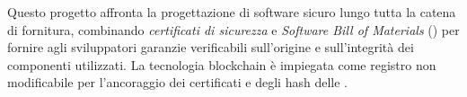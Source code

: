 Questo progetto affronta la progettazione di software sicuro lungo tutta la catena di fornitura,
combinando \emph{certificati di sicurezza} e \emph{Software Bill of Materials} (\sbom) per fornire
agli sviluppatori garanzie verificabili sull'origine e sull'integrità dei componenti utilizzati.
La tecnologia blockchain è impiegata come registro non modificabile per l'ancoraggio dei
certificati e degli hash delle \sbom.

